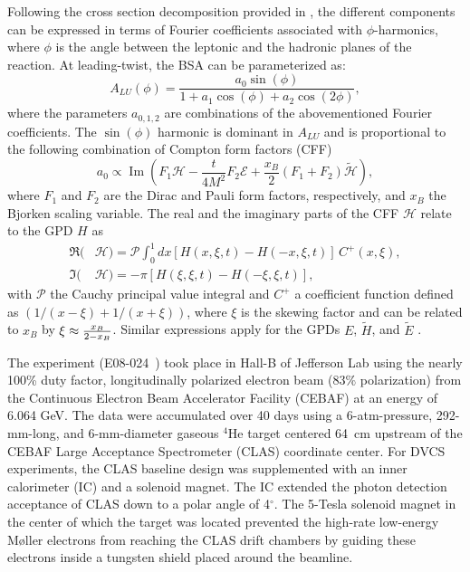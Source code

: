\documentclass[twocolumn,nofootinbib,showpacs,prl,superscriptaddress,secnumarabic,amssymb,nobibnotes,aps,floatfix]{revtex4}
\begin{document}
Following the cross section decomposition provided in \cite{Belitsky:2001ns}, 
the different components can be expressed in terms of Fourier coefficients 
associated with $\phi$-harmonics, where $\phi$ is the angle between the 
leptonic and the hadronic planes of the reaction. At leading-twist, the BSA can 
be parameterized as: 
\begin{equation}
   A_{LU}(\phi) = \frac{a_{0}\sin(\phi)}{1+a_{1}\cos(\phi)+a_{2}\cos(2\phi)},
   \label{eq:alu-simp}
\end{equation}
where the parameters $a_{0,1,2}$ are combinations of the abovementioned Fourier 
coefficients. The $\sin(\phi)$ harmonic is dominant in $A_{LU}$ and is 
proportional to the following combination of Compton form factors (CFF) 
\cite{Guidal:2013rya}
\begin{equation}
   a_{0} \propto \operatorname{Im}( F_1 \mathcal{H}- \frac{t}{4M^2} F_2 
   \mathcal{E}+ \frac{x_B}{2}(F_1+F_2)\tilde{\mathcal{H}}),
\end{equation}
where $F_1$ and $F_2$ are the Dirac and Pauli form factors, respectively, and 
$x_B$ the Bjorken scaling variable. The real and the imaginary parts of the CFF 
$\mathcal{H}$ relate to the GPD $H$ as  \begin{align}
   \Re(&\mathcal{H}) = \mathcal{P} \int_{0}^{1}dx[H(x,\xi,t)-H(-x,\xi,t)] \, 
   C^{+}(x,\xi), \\
   \Im(&\mathcal{H}) = - \pi [H(\xi,\xi,t)-H(-\xi,\xi,t)],
\end{align}
with $\mathcal{P}$ the Cauchy principal value integral and $C^{+}$ a 
coefficient function defined as $(1/(x-\xi) + 1/(x+\xi))$, where $\xi$ is the 
skewing factor and can be related to $x_B$ by $\xi\approx {{x_B}\over{2-x_B}}$.  
Similar expressions apply for the GPDs $E$, $\widetilde{H}$, and 
$\widetilde{E}$ \cite{Guidal:2013rya}.


The experiment (E08-024~\cite{Hafidi:2008pr}) took place in Hall-B of Jefferson 
Lab using the nearly 100\% duty factor, longitudinally polarized electron beam 
(83$\%$ polarization) from the Continuous Electron Beam Accelerator Facility 
(CEBAF) at an energy of 6.064 GeV. The data were accumulated over 40 days using 
a 6-atm-pressure, 292-mm-long, and 6-mm-diameter gaseous $^4$He target centered 
64~cm upstream of the CEBAF Large Acceptance Spectrometer (CLAS) coordinate 
center. For DVCS experiments, the CLAS baseline design \cite{Mecking:2003zu} 
was supplemented with an inner calorimeter (IC) and a solenoid magnet. The IC 
extended the photon detection acceptance of CLAS down to a polar angle of 
4$^{\circ}$. The 5-Tesla solenoid magnet in the center of which the target was 
located prevented the high-rate low-energy M{\o}ller electrons from reaching 
the CLAS drift chambers by guiding these electrons inside a tungsten shield 
placed around the beamline. 
\end{document}

